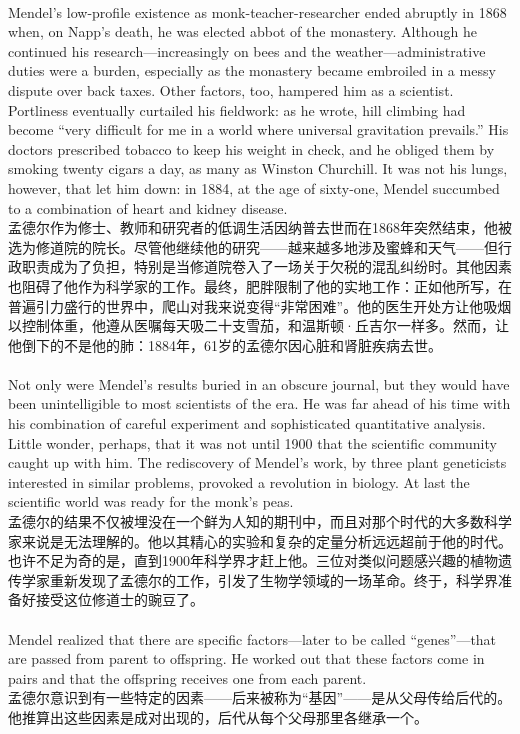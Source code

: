 \documentclass{article}
\begin{document}
\\
Mendel’s low-profile existence as monk-teacher-researcher ended abruptly in 1868 when, on Napp’s death, he was elected abbot of the monastery. Although he continued his research—increasingly on bees and the weather—administrative duties were a burden, especially as the monastery became embroiled in a messy dispute over back taxes. Other factors, too, hampered him as a scientist. Portliness eventually curtailed his fieldwork: as he wrote, hill climbing had become “very difficult for me in a world where universal gravitation prevails.” His doctors prescribed tobacco to keep his weight in check, and he obliged them by smoking twenty cigars a day, as many as Winston Churchill. It was not his lungs, however, that let him down: in 1884, at the age of sixty-one, Mendel succumbed to a combination of heart and kidney disease.\\
孟德尔作为修士、教师和研究者的低调生活因纳普去世而在1868年突然结束，他被选为修道院的院长。尽管他继续他的研究——越来越多地涉及蜜蜂和天气——但行政职责成为了负担，特别是当修道院卷入了一场关于欠税的混乱纠纷时。其他因素也阻碍了他作为科学家的工作。最终，肥胖限制了他的实地工作：正如他所写，在普遍引力盛行的世界中，爬山对我来说变得“非常困难”。他的医生开处方让他吸烟以控制体重，他遵从医嘱每天吸二十支雪茄，和温斯顿·丘吉尔一样多。然而，让他倒下的不是他的肺：1884年，61岁的孟德尔因心脏和肾脏疾病去世。\\

\\
Not only were Mendel’s results buried in an obscure journal, but they would have been unintelligible to most scientists of the era. He was far ahead of his time with his combination of careful experiment and sophisticated quantitative analysis. Little wonder, perhaps, that it was not until 1900 that the scientific community caught up with him. The rediscovery of Mendel’s work, by three plant geneticists interested in similar problems, provoked a revolution in biology. At last the scientific world was ready for the monk’s peas.\\
孟德尔的结果不仅被埋没在一个鲜为人知的期刊中，而且对那个时代的大多数科学家来说是无法理解的。他以其精心的实验和复杂的定量分析远远超前于他的时代。也许不足为奇的是，直到1900年科学界才赶上他。三位对类似问题感兴趣的植物遗传学家重新发现了孟德尔的工作，引发了生物学领域的一场革命。终于，科学界准备好接受这位修道士的豌豆了。\\

\\
Mendel realized that there are specific factors—later to be called “genes”—that are passed from parent to offspring. He worked out that these factors come in pairs and that the offspring receives one from each parent.\\
孟德尔意识到有一些特定的因素——后来被称为“基因”——是从父母传给后代的。他推算出这些因素是成对出现的，后代从每个父母那里各继承一个。\\
\end{document}

